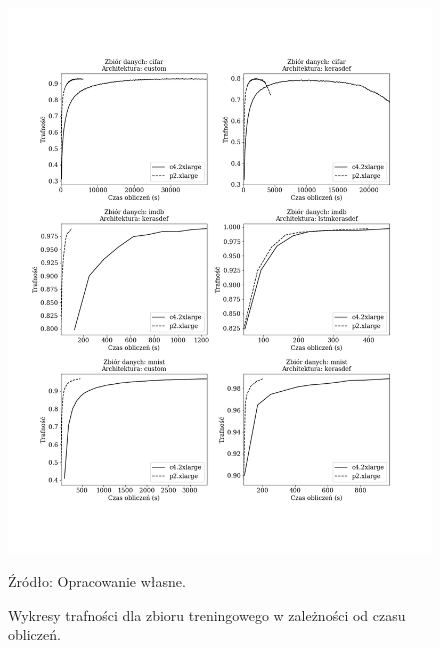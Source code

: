 \documentclass[12pt,a4paper,twoside]{article}
\newcommand{\source}[1]{\caption*{\hfill Źródło: {#1}} }
\begin{document}
\begin{figure}[h]
  \centering
\includegraphics[scale=0.5]{../obrazy/fig:experiment_acc_timecum.png}
\caption{Wykresy trafności dla zbioru treningowego w zależności od czasu obliczeń.\label{fig:experiment_acc_timecum}}
\source{Opracowanie własne.}
\end{figure}
\end{document}
